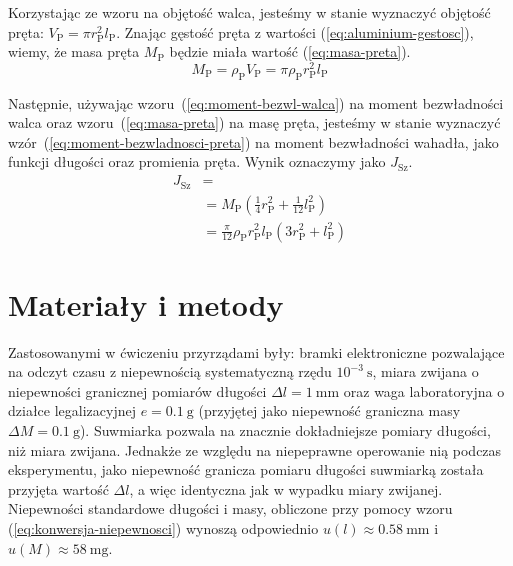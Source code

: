 \documentclass[twocolumn, a4paper, polish, 10pt]{article}
\newcommand{\JXn}[1]{\ensuremath{ J_{\mathrm{#1}} }}
\begin{document}
Korzystając ze wzoru na objętość walca, jesteśmy w stanie wyznaczyć objętość pręta: $V_{\mathrm{P}} = \pi r_{\mathrm{P}}^2 l_{\mathrm{P}}$.
Znając gęstość pręta z wartości (\ref{eq:aluminium-gestosc}), wiemy, że masa pręta $M_{\mathrm{P}}$ będzie miała wartość (\ref{eq:masa-preta}).
\begin{equation}
    M_{\mathrm{P}}
    = \rho_{\mathrm{P}} V_{\mathrm{P}}
    = \pi \rho_{\mathrm{P}} r_{\mathrm{P}}^2 l_{\mathrm{P}}
    \label{eq:masa-preta}
\end{equation}

Następnie, używając wzoru~(\ref{eq:moment-bezwl-walca}) na moment bezwładności walca oraz wzoru~(\ref{eq:masa-preta}) na masę pręta, jesteśmy w stanie wyznaczyć wzór~(\ref{eq:moment-bezwladnosci-preta}) na moment bezwładności wahadła, jako funkcji długości oraz promienia pręta.
Wynik oznaczymy jako $\JXn{Sz}$.
\begin{equation}
\begin{split}
    \JXn{Sz} &= \\
    &= M_{\mathrm{P}} \left(
        \frac{1}{4} r_\mathrm{P}^2 + \frac{1}{12} l_\mathrm{P}^2
    \right) \\
    &= \frac{\pi}{12} \rho_{\mathrm{P}} r_{\mathrm{P}}^2 l_{\mathrm{P}} \left(
        3 r_\mathrm{P}^2 + l_\mathrm{P}^2
    \right)
    \label{eq:moment-bezwladnosci-preta}
\end{split}
\end{equation}

\section{Materiały i metody}
Zastosowanymi w ćwiczeniu przyrządami były: bramki elektroniczne pozwalające na odczyt czasu z niepewnością systematyczną rzędu $10^{-3}~\mathrm{s}$, miara zwijana o niepewności granicznej pomiarów długości $\Delta l = 1~\mathrm{mm}$ oraz waga laboratoryjna o działce legalizacyjnej $e = 0.1~\mathrm{g}$ (przyjętej jako niepewność graniczna masy $\Delta M = 0.1~\mathrm{g}$).
Suwmiarka pozwala na znacznie dokładniejsze pomiary długości, niż miara zwijana. Jednakże ze względu na niepeprawne operowanie nią podczas eksperymentu, jako niepewność granicza pomiaru długości suwmiarką została przyjęta wartość $\Delta l$, a więc identyczna jak w wypadku miary zwijanej. 
Niepewności standardowe długości i masy, obliczone przy pomocy wzoru (\ref{eq:konwersja-niepewnosci}) wynoszą odpowiednio $u(l) \approx 0.58~\mathrm{mm}$ i $u(M) \approx 58~\mathrm{mg}$. 
\end{document}
